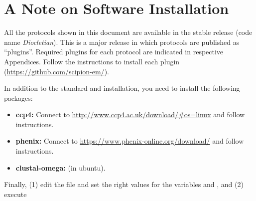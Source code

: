 \section{A Note on Software Installation}
  All the protocols shown in this document are available in the stable \scipion release  (code name \textit{Diocletian}). This is a major release in which protocols are published as ``plugins''. Required plugins for each protocol are indicated in respective Appendices. Follow the instructions to install each plugin (\url{https://github.com/scipion-em/}).


  In addition to the standard \scipion and  installation, you need to install the following packages:
  
  \begin{itemize}
   \item\textbf{ccp4:} Connect to \url{http://www.ccp4.ac.uk/download/#os=linux} and follow instructions.
   \item\textbf{phenix:} Connect to \url{https://www.phenix-online.org/download/} and follow instructions.
   \item\textbf{clustal-omega:}  (in ubuntu).
  \end{itemize}

  
  Finally, (1) edit the file  and set the right values for the variables  and , and (2) execute 
